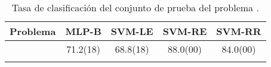 \begin{table}[h]
  \tableStyle
  \begin{tabular}{lSSSS}
    \toprule
    {Problema}      & {MLP-B}  & {SVM-LE} & {SVM-RE} & {SVM-RR} \\
    \midrule
    \deltamirbase{} & 71.2(18) & 68.8(18) & 88.0(00) & 84.0(00) \\
    \bottomrule
    \\
  \end{tabular}
  \caption{\captionStyle Tasa de clasificación del conjunto de prueba
    del problema .}
  \label{tbl:suppl-deltamirbase21}

\end{table}